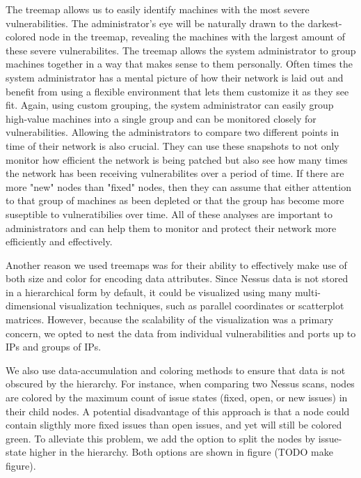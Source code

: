 \documentclass{acm_proc_article-sp}
\begin{document}
The treemap allows us to easily identify machines with the most severe vulnerabilities. The administrator's eye will be naturally drawn to the darkest-colored node in the treemap, revealing the machines with the largest amount of these severe vulnerabilites. The treemap allows the system administrator to group machines together in a way that makes sense to them personally. Often times the system administrator has a mental picture of how their network is laid out and benefit from using a flexible environment that lets them customize it as they see fit. Again, using custom grouping, the system administrator can easily group high-value machines into a single group and can be monitored closely for vulnerabilities. Allowing the administrators to compare two different points in time of their network is also crucial. They can use these snapshots to not only monitor how efficient the network is being patched but also see how many times the network has been receiving vulnerabilites over a period of time. If there are more "new" nodes than "fixed" nodes, then they can assume that either attention to that group of machines as been depleted or that the group has become more suseptible to vulneratibilies over time. All of these analyses are important to administrators and can help them to monitor and protect their network more efficiently and effectively.

Another reason we used treemaps was for their ability to effectively make use of both size and color for encoding data attributes.
Since Nessus data is not stored in a hierarchical form by default, it could be visualized using many multi-dimensional visualization techniques, such as parallel coordinates or scatterplot matrices.
However, because the scalability of the visualization was a primary concern, we opted to nest the data from individual vulnerabilities and ports up to IPs and groups of IPs.

We also use data-accumulation and coloring methods to ensure that data is not obscured by the hierarchy.
For instance, when comparing two Nessus scans, nodes are colored by the maximum count of issue states (fixed, open, or new issues) in their child nodes.
A potential disadvantage of this approach is that a node could contain sligthly more fixed issues than open issues, and yet will still be colored green.
To alleviate this problem, we add the option to split the nodes by issue-state higher in the hierarchy.
Both options are shown in figure (TODO make figure).
\end{document}
